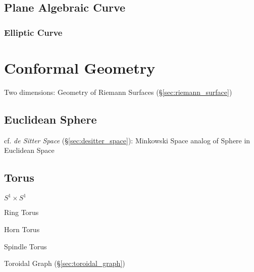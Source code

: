 \subsection{Plane Algebraic Curve}\label{sec:plane_algebraic_curve}

\subsubsection{Elliptic Curve}\label{sec:elliptic_curve}



\section{Conformal Geometry}\label{sec:conformal_geometry}

Two dimensions: Geometry of Riemann Surfaces
(\S\ref{sec:riemann_surface})



\subsection{Euclidean Sphere}\label{sec:euclidean_sphere}

cf. \emph{de Sitter Space} (\S\ref{sec:desitter_space}): Minkowski Space analog
of Sphere in Euclidean Space



\subsection{Torus}\label{sec:torus}

$S^1 \times S^1$

Ring Torus

Horn Torus

Spindle Torus

\fist Toroidal Graph (\S\ref{sec:toroidal_graph})



